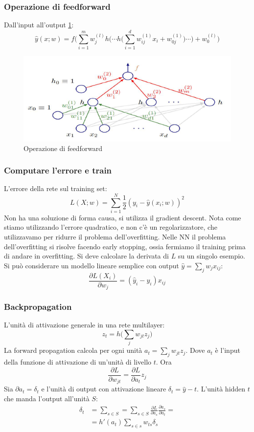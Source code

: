 		\subsubsection{Operazione di feedforward}
		Dall'input all'output \ref{fig:chapter11-09}:
		$$\hat{y}(x;w) = f\bigl(\sum\limits_{i=1}^mw_j^{(l)}h\bigl(\cdots h\bigl(\sum\limits_{i = 1}^dw_{ij}^{(1)}x_i + w_{0j}^{(1)}\bigr)\cdots\bigr) + w_0^{(l)}\bigr)$$
		
		\begin{figure}
			\centering
			\includegraphics[width=0.6\linewidth]{imgs/chapter11/img9}
			\caption{Operazione di feedforward}
			\label{fig:chapter11-09}
		\end{figure}
		
		\subsubsection{Computare l'errore e train}
		L'errore della rete sul training set:
		$$L(X;w) = \sum\limits_{i=1}^N\frac{1}{2}(y_i-\hat{y}(x_i;w))^2$$
		Non ha una soluzione di forma causa, si utilizza il gradient descent. 
		Nota come stiamo utilizzando l'errore quadratico, e non c'\`e un regolarizzatore, che utilizzavamo per ridurre il problema dell'overfitting. 
		Nelle NN il problema dell'overfitting si risolve facendo early stopping, ossia fermiamo il training prima di andare in overfitting.
		Si deve calcolare la derivata di $L$ su un singolo esempio.
		Si pu\`o considerare un modello lineare semplice con output $\hat{y} = \sum\limits_jw_jx_{ij}$:
		$$\frac{\partial L(X_i)}{\partial w_j} = (\hat{y}_i -y_i)x_{ij}$$
		
		\subsubsection{Backpropagation}
		L'unit\`a di attivazione generale in una rete multilayer:
		$$z_t = h\bigl(\sum\limits_jw_{jt}z_j\bigr)$$
		La forward propagation calcola per ogni unit\`a $a_t = \sum\limits_j w_{jt}z_j$.
		Dove $a_t$ \`e l'input della funzione di attivazione di un'unit\`a di livello $t$.
		Ora
		$$\frac{\partial L}{\partial w_{jt}} = \frac{\partial L}{\partial a_t}z_j$$
		Sia $\partial a_t = \delta_t$ e l'unit\`a di output con attivazione lineare $\delta_t = \hat{y} -t$.
		L'unit\`a hidden $t$ che manda l'output all'unit\`a $S$:
		\begin{align*}
			\delta_t &= \sum\limits_{s\in S} = \sum\limits_{s\in S}\frac{\partial L}{\partial a_s}\frac{\partial a_s}{\partial a_t}=\\
			&= h'(a_t)\sum\limits_{s\in s} w_{ts}\delta_s
		\end{align*}
		
